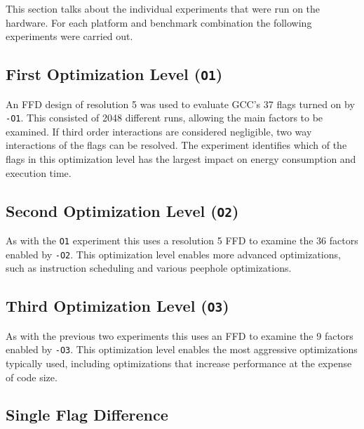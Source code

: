 \documentclass[twocolumn]{article}
\begin{document}
This section talks about the individual experiments that were run on the hardware. For each platform and benchmark combination the following experiments were carried out.

\subsection*{First Optimization Level (\texttt{O1})}

An FFD design of resolution 5 was used to evaluate GCC's 37 flags turned on by \texttt{-O1}. This consisted of 2048 different runs, allowing the main factors to be examined. If third order interactions are considered negligible, two way interactions of the flags can be resolved. The experiment identifies which of the flags in this optimization level has the largest impact on energy consumption and execution time.

\subsection*{Second Optimization Level (\texttt{O2})}

As with the \texttt{O1} experiment this uses a resolution 5 FFD to examine the 36 factors enabled by \texttt{-O2}. This optimization level enables more advanced optimizations, such as instruction scheduling and various peephole optimizations.

\subsection*{Third Optimization Level (\texttt{O3})}

As with the previous two experiments this uses an FFD to examine the 9 factors enabled by \texttt{-O3}. This optimization level enables the most aggressive optimizations typically used, including optimizations that increase performance at the expense of code size.



\subsection*{Single Flag Difference}
\end{document}
